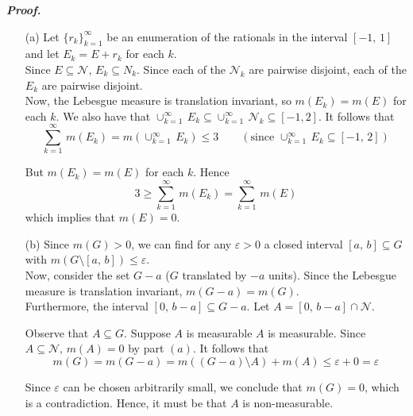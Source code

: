 \documentclass[a4paper,11pt]{article}
\begin{document}
\textbf{\textit{Proof.}}

\begin{enumerate}
	\item [(a)]
		Let $\{r_k\}_{k=1}^\infty$ be an enumeration of the rationals in the interval $[-1,\,1]$ and let $E_k = E + r_k$ for each $k$.\\

		Since $E \subseteq \mathcal{N}$, $E_k \subseteq N_k$. Since each of the $\mathcal{N}_k$ are pairwise disjoint, each of the $E_k$ are pairwise disjoint.\\

		Now, the Lebesgue measure is translation invariant, so $m(E_k) = m(E)$ for each $k$. We also have that $\cup_{k = 1}^\infty\,E_k \subseteq \cup_{k=1}^\infty\,\mathcal{N}_k \subseteq [-1,2]$. It follows that
			$$\sum_{k=1}^\infty\,m(E_k) = m(\cup_{k=1}^\infty\,E_k) \leq 3 \quad \quad (\text{since } \cup_{k=1}^\infty\,E_k \subseteq [-1,\,2])$$

		But $m(E_k) = m(E)$ for each $k$. Hence
			$$3 \geq \sum_{k=1}^\infty\,m(E_k) = \sum_{k=1}^\infty\,m(E)$$
		which implies that $m(E) = 0$.\\

	\item [(b)]
		Since $m(G) > 0$, we can find for any $\varepsilon > 0$ a closed interval $[a,\,b] \subseteq G$ with $m(G \setminus [a,\,b]) \leq \varepsilon$.\\

		Now, consider the set $G - a$ ($G$ translated by $-a$ units). Since the Lebesgue measure is translation invariant, $m(G - a) = m(G)$.\\

		Furthermore, the interval $[0,\,b-a] \subseteq G-a$. Let $A = [0,\,b-a] \cap \mathcal{N}$.

		Observe that $A \subseteq G$. Suppose $A$ is measurable $A$ is measurable. Since $A \subseteq \mathcal{N},\,m(A) = 0$ by part $(a)$. It follows that
			$$m(G) = m(G - a) = m((G - a) \setminus A) + m(A) \leq \varepsilon + 0 = \varepsilon$$

		Since $\varepsilon$ can be chosen arbitrarily small, we conclude that $m(G) = 0$, which is a contradiction. Hence, it must be that $A$ is non-measurable.\\\\\\

\end{enumerate}


\end{document}
